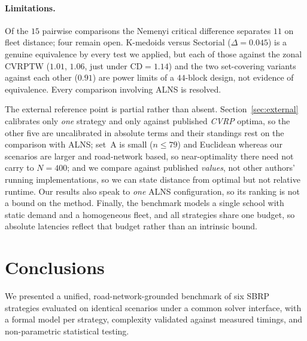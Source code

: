 \documentclass[graybox]{SNmult}
\begin{document}
\paragraph{Limitations.}
Of the $15$ pairwise comparisons the Nemenyi critical difference separates
$11$ on fleet distance; four remain open. K-medoids versus Sectorial
($\Delta=0.045$) is a genuine equivalence by every test we applied, but
each of those against the zonal CVRPTW ($1.01$, $1.06$, just under
$\mathrm{CD}=1.14$) and the two set-covering variants against each other
($0.91$) are power limits of a $44$-block design, not evidence of
equivalence. Every comparison involving ALNS is resolved.

The external reference point is partial rather than absent.
Section~\ref{sec:external} calibrates only \emph{one} strategy and only
against published \emph{CVRP} optima, so the other five are uncalibrated
in absolute terms and their standings rest on the comparison with ALNS;
set~A is small ($n\le79$) and Euclidean whereas our scenarios are larger
and road-network based, so near-optimality there need not carry to
$N=400$; and we compare against published \emph{values}, not other
authors' running implementations, so we can state distance from optimal
but not relative runtime. Our results also speak to \emph{one} ALNS
configuration, so its ranking is not a bound on the method. Finally, the
benchmark models a single school with static demand and a homogeneous
fleet, and all strategies share one budget, so absolute latencies reflect
that budget rather than an intrinsic bound.

\section{Conclusions}\label{sec:conclusions}
We presented a unified, road-network-grounded benchmark of six SBRP
strategies evaluated on identical scenarios under a common solver
interface, with a formal model per strategy, complexity validated against
measured timings, and non-parametric statistical testing.
\end{document}
